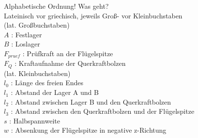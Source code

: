 
Alphabetische Ordnung! Was geht?\\ 
Lateinisch vor griechisch, jeweils Groß- vor Kleinbuchstaben\\
(lat. Großbuchstaben)\\

\noindent $ A $ : Festlager\\
$ B $ : Loslager\\
$ F_{pruef} $ : Prüfkraft an der Flügelspitze\\
$ F_{Q} $ : Kraftaufnahme der Querkraftbolzen \\



\noindent (lat. Kleinbuchstaben)\\

\noindent $l_{0}$ : Länge des freien Endes\\
$l_{1}$ : Abstand der Lager A und B\\
$l_{2}$ : Abstand zwischen Lager B und den Querkraftbolzen\\
\noindent $l_{3}$ : Abstand zwischen den Querkraftbolzen und der Flügelspitze\\
$ s $ : Halbspannweite\\
$ w $ : Absenkung der Flügelspitze in negative z-Richtung



